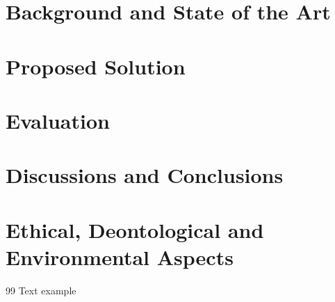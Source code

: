 \documentclass[12pt,a4paper]{report}
\begin{document}
\chapter{Background and State of the Art}

\chapter{Proposed Solution}

\chapter{Evaluation}

\chapter{Discussions and Conclusions}

\chapter{Ethical, Deontological and Environmental Aspects}


\newpage
{}
\begin{thebibliography}{99}
     Text example
\end{thebibliography}
\end{document}
